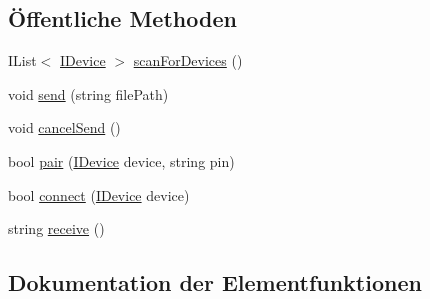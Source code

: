 \subsection*{Öffentliche Methoden}
\begin{DoxyCompactItemize}
\item 
I\+List$<$ \mbox{\hyperlink{interfacemy_m_d_1_1_model_interface_1_1_transmission_model_interface_1_1_i_device}{I\+Device}} $>$ \mbox{\hyperlink{interfacemy_m_d_1_1_model_1_1_transmission_model_1_1_i_bluetooth_adfa691c5290cab1d92390f585cc9abdb}{scan\+For\+Devices}} ()
\item 
void \mbox{\hyperlink{interfacemy_m_d_1_1_model_1_1_transmission_model_1_1_i_bluetooth_a3ae2f74750177a849765df54ea32f788}{send}} (string file\+Path)
\item 
void \mbox{\hyperlink{interfacemy_m_d_1_1_model_1_1_transmission_model_1_1_i_bluetooth_ad17c0199f5a72b2964b5b38b565ad6fc}{cancel\+Send}} ()
\item 
bool \mbox{\hyperlink{interfacemy_m_d_1_1_model_1_1_transmission_model_1_1_i_bluetooth_a8bb41d3ca3ff3264de397bccd555e8b8}{pair}} (\mbox{\hyperlink{interfacemy_m_d_1_1_model_interface_1_1_transmission_model_interface_1_1_i_device}{I\+Device}} device, string pin)
\item 
bool \mbox{\hyperlink{interfacemy_m_d_1_1_model_1_1_transmission_model_1_1_i_bluetooth_a02d846b9c9b31d1ea1d35780928c3ba4}{connect}} (\mbox{\hyperlink{interfacemy_m_d_1_1_model_interface_1_1_transmission_model_interface_1_1_i_device}{I\+Device}} device)
\item 
string \mbox{\hyperlink{interfacemy_m_d_1_1_model_1_1_transmission_model_1_1_i_bluetooth_aa835ad437ee703e3ae74f43e09c28fbc}{receive}} ()
\end{DoxyCompactItemize}


\subsection{Dokumentation der Elementfunktionen}
\mbox{\label{interfacemy_m_d_1_1_model_1_1_transmission_model_1_1_i_bluetooth_ad17c0199f5a72b2964b5b38b565ad6fc}} 
